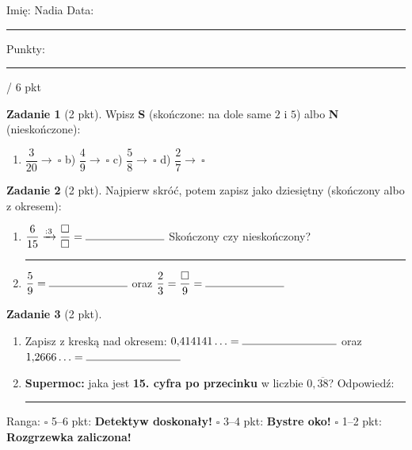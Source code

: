 \documentclass[11pt,a4paper]{article}
\begin{document}

\vspace{0.2em}
Imię: Nadia \hfill Data: \rule{3cm}{0.4pt} \hfill Punkty: \rule{1.2cm}{0.4pt} / 6 pkt

\vspace{0.6em}
\textbf{Zadanie 1} (2 pkt). Wpisz \textbf{S} (skończone: na dole same $2$ i $5$) albo \textbf{N} (nieskończone):
\begin{enumerate}[label=\alph*), leftmargin=*, itemsep=4pt]
  \item $\dfrac{3}{20}\rightarrow\ \square$ \hspace{1cm} b) $\dfrac{4}{9}\rightarrow\ \square$ \hspace{1cm} c) $\dfrac{5}{8}\rightarrow\ \square$ \hspace{1cm} d) $\dfrac{2}{7}\rightarrow\ \square$
\end{enumerate}

\textbf{Zadanie 2} (2 pkt). Najpierw skróć, potem zapisz jako dziesiętny (skończony albo z okresem):
\begin{enumerate}[label=\alph*), leftmargin=*, itemsep=4pt]
  \item $\dfrac{6}{15}\xrightarrow{:3}\dfrac{\square}{\square}=\rule{2.5cm}{0.4pt}$ \quad Skończony czy nieskończony? \rule{3cm}{0.4pt}
  \item $\dfrac{5}{9}=\rule{2.5cm}{0.4pt}$ \quad oraz \quad $\dfrac{2}{3}=\dfrac{\square}{9}=\rule{2.5cm}{0.4pt}$
\end{enumerate}

\textbf{Zadanie 3} (2 pkt).
\begin{enumerate}[label=\alph*), leftmargin=*, itemsep=4pt]
  \item Zapisz z kreską nad okresem: $0{,}414141\ldots=\rule{3cm}{0.4pt}$ oraz $1{,}2666\ldots=\rule{3cm}{0.4pt}$
  \item \textbf{Supermoc:} jaka jest \textbf{15. cyfra po przecinku} w liczbie $0{,}\overline{38}$? Odpowiedź: \rule{2cm}{0.4pt}
\end{enumerate}

\vspace{0.6em}
\begin{tcolorbox}[colback=white, colframe=cel, boxrule=0.6pt, arc=2pt]
Ranga: \quad $\square$ 5--6 pkt: \textbf{Detektyw doskonały!} \quad $\square$ 3--4 pkt: \textbf{Bystre oko!} \quad $\square$ 1--2 pkt: \textbf{Rozgrzewka zaliczona!}
\end{tcolorbox}
\end{document}
